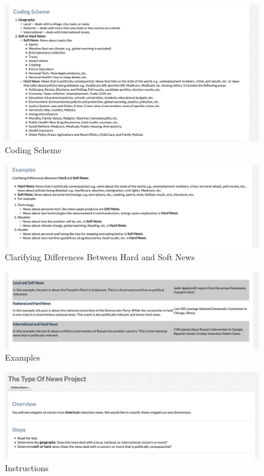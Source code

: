 \documentclass[12pt, letterpaper]{article}
\begin{document}
\begin{figure}[H]
  \centering
  \caption{Coding Scheme}
  \label{fig:coding_scheme}
  \includegraphics[width=\linewidth]{../data/screenshots/coding_scheme.png}
\end{figure}

\begin{figure}[H]
  \centering
  \caption{Clarifying Differences Between Hard and Soft News}
  \label{fig:clarifying_diff}
  \includegraphics[width=\linewidth]{../data/screenshots/clarifying_diff.png}
\end{figure}

\begin{figure}[H]
  \centering
  \caption{Examples}
  \label{fig:examples}
  \includegraphics[width=\linewidth]{../data/screenshots/examples.png}
\end{figure}

\begin{figure}[H]
    \centering
    \caption{Instructions}
    \label{fig:instructions}
    \includegraphics[width=\linewidth]{../data/screenshots/instructions.png}
\end{figure}
\end{document}

